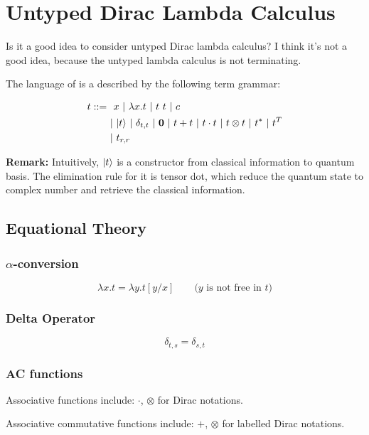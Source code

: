\section{Untyped Dirac Lambda Calculus}
Is it a good idea to consider untyped Dirac lambda calculus? I think it's not a good idea, because the untyped lambda calculus is not terminating.

\begin{definition}

    The language of is a described by the following term grammar:

    \begin{align*}
        t ::=\ & \ x\ |\ \lambda x.t\ |\ t\ t\ |\ c \\
              & |\ |t\rangle\ |\ \delta_{t, t} \ |\ \mathbf{0}\ |\ t + t\ |\ t \cdot t\ |\ t \otimes t\ |\ t^*\ |\ t^T\\
              & |\ t_{r, r}
    \end{align*}

\end{definition}

\textbf{Remark:} Intuitively, $|t\rangle$ is a constructor from classical information to quantum basis. The elimination rule for it is tensor dot, which reduce the quantum state to complex number and retrieve the classical information.


\subsection{Equational Theory}

\subsubsection*{$\alpha$-conversion}
$$
    \lambda x.t = \lambda y.t[y/x]\qquad \text{($y$ is not free in $t$)}
$$

\subsubsection*{Delta Operator}
$$
    \delta_{t, s} = \delta_{s, t}
$$

\subsubsection*{AC functions}

Associative functions include: $\cdot$, $\otimes$ for Dirac notations. 

Associative commutative functions include: $+$, $\otimes$ for labelled Dirac notations.

